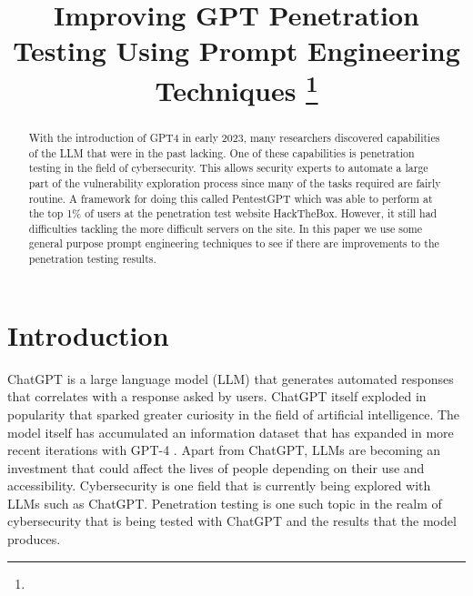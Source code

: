 \documentclass[conference]{IEEEtran}
\begin{document}
\title{Improving GPT Penetration Testing Using Prompt Engineering Techniques
\thanks{}
}
\author{
\and
{}
\and
{}
}

\maketitle

\begin{abstract}
    With the introduction of GPT4 in early 2023, many researchers discovered capabilities of the LLM that were in the past lacking. One of these capabilities is penetration testing in the field of cybersecurity. This allows security experts to automate a large part of the vulnerability exploration process since many of the tasks required are fairly routine. A framework for doing this called PentestGPT which was able to perform at the top 1\% of users at the penetration test website HackTheBox. However, it still had difficulties tackling the more difficult servers on the site. In this paper we use some general purpose prompt engineering techniques to see if there are improvements to the penetration testing results.
\end{abstract}

\section{Introduction} \label{sec:introduction}
ChatGPT is a large language model (LLM) that generates automated responses that correlates with a response asked by users\cite{engman2023evaluation}. ChatGPT itself exploded in popularity that sparked greater curiosity in the field of artificial intelligence. The model itself has accumulated an information dataset that has expanded in more recent iterations with GPT-4 \cite{hariri2023unlocking}. Apart from ChatGPT, LLMs are becoming an investment that could affect the lives of people depending on their use and accessibility. Cybersecurity is one field that is currently being explored with LLMs such as ChatGPT. Penetration testing is one such topic in the realm of cybersecurity that is being tested with ChatGPT and the results that the model produces.
\end{document}
